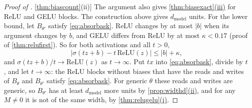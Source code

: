 \documentclass[10pt]{article}
\theoremstyle{definition}
\theoremstyle{remark}
\newcommand{\dm}{d_{\mathrm{model}}}
\DeclareRobustCommand{\cpref}[2]{\hyperref[#1:#2]{\cref*{#1}(#2)}}
\begin{document}
\begin{proof}[Proof of \cpref{thm:biascount}{ii}]
The argument also gives \cpref{thm:biasexact}{iii} for ReLU and GELU blocks. The construction above gives $\dm$ units. For the lower bound, let $B_{\theta'}$ satisfy \eqref{eq:absorbask}. ReLU changes by at most $\lvert b\rvert$ when its argument changes by $b$, and GELU differs from ReLU by at most $\kappa < 0.17$ (proof of \cref{thm:relufirst}). So for both activations and all $t > 0$,
\[
\big\lvert \sigma(tz + b) - t\,\mathrm{ReLU}(z)\big\rvert \le \lvert b\rvert + \kappa,
\]
and $\sigma(tz + b)/t \to \mathrm{ReLU}(z)$ as $t \to \infty$. Put $tx$ into \eqref{eq:absorbask}, divide by $t$, and let $t \to \infty$: the ReLU blocks without biases that have the reads and writes of $B_\theta$ and $B_{\theta'}$ satisfy \eqref{eq:absorbask}. For generic $\theta$ these reads and writes are generic, so $B_{\theta'}$ has at least $\dm$ more units by \cpref{prop:widthd}{ii}, and for any $M \neq 0$ it is not of the same width, by \cpref{thm:relugelu}{i}.
\end{proof}
\end{document}
